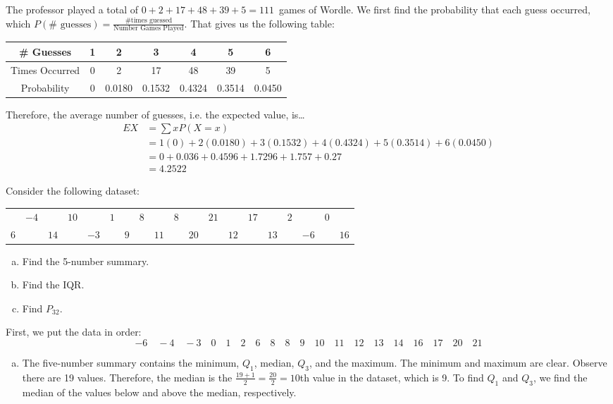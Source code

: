 \documentclass[12pt,letterpaper]{exam}
\begin{document}
\begin{questions}
\sol The professor played a total of $0 + 2 + 17 + 48 + 39 + 5= 111$~games of Wordle. We first find the probability that each guess occurred, which $P(\# \text{ guesses})= \frac{\text{\# times guessed}}{\text{Number Games Played}}$. That gives us the following table: \par
	\begin{table}[h]
	\centering
	\begin{tabular}{c||cccccc}
	\# Guesses & 1 & 2 & 3 & 4 & 5 & 6 \\ \hline
	Times Occurred & 0 & 2 & 17 & 48 & 39 & 5 \\
	Probability & 0 & 0.0180 & 0.1532 & 0.4324 & 0.3514 & 0.0450
	\end{tabular}
	\end{table} \par
Therefore, the average number of guesses, i.e. the expected value, is\dots
	\[
	\begin{aligned}
	EX&= \sum x P(X= x) \\[0.3cm]
	&= 1(0) + 2(0.0180) + 3(0.1532) + 4(0.4324) + 5(0.3514) + 6(0.0450) \\[0.3cm]
	&= 0 + 0.036 + 0.4596 + 1.7296 + 1.757 + 0.27 \\[0.3cm]
	&= 4.2522
	\end{aligned}
	\]



\newpage
\question[10] Consider the following dataset: \par
	\begin{table}[h]
	\centering
	\begin{tabular}{rrrrrrrrrrrrrrrrrrr}
	& $-4$ && $10$ && $1$ && $8$ && $8$ && $21$ && $17$ && $2$ && $0$ \\ 
	$6$ && $14$ && $-3$ && $9$ && $11$ && $20$ && $12$ && $13$ && $-6$ && $16$
	\end{tabular}
	\end{table} \par

\begin{enumerate}[(a)]
\item Find the 5-number summary. 
\item Find the IQR. 
\item Find $P_{32}$. 
\end{enumerate} \pspace

\sol First, we put the data in order:
	\[
	-6 \quad -4 \quad -3 \quad 0 \quad 1 \quad 2 \quad  6 \quad 8 \quad 8 \quad 9 \quad 10 \quad 11 \quad 12 \quad 13 \quad 14 \quad 16 \quad 17 \quad 20 \quad 21
	\]
\begin{enumerate}[(a)]
\item The five-number summary contains the minimum, $Q_1$, median, $Q_3$, and the maximum. The minimum and maximum are clear. Observe there are 19 values. Therefore, the median is the $\frac{19 + 1}{2}= \frac{20}{2}= 10$th value in the dataset, which is 9. To find $Q_1$ and $Q_3$, we find the median of the values below and above the median, respectively. 


\end{enumerate}
\end{questions}
\end{document}
